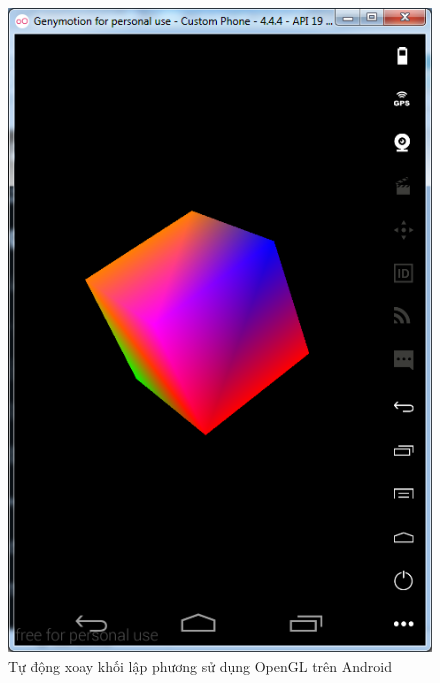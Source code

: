 \documentclass[13pt,a4paper]{extreport}
\begin{document}
\begin{enumerate}[{\it a.}]
\begin{itemize}
\begin{figure}[!h]
\begin{center}
						\hspace{.5cm}
						\includegraphics[scale=.6]{images/opengles-cube-4.png}
					\end{center}
					\caption{Tự động xoay khối lập phương sử dụng OpenGL trên Android}
					\label{Fig:opengles-cube-rotate}
				\end{figure}							 
			\end{itemize}
	\end{enumerate}
	
\end{document}
